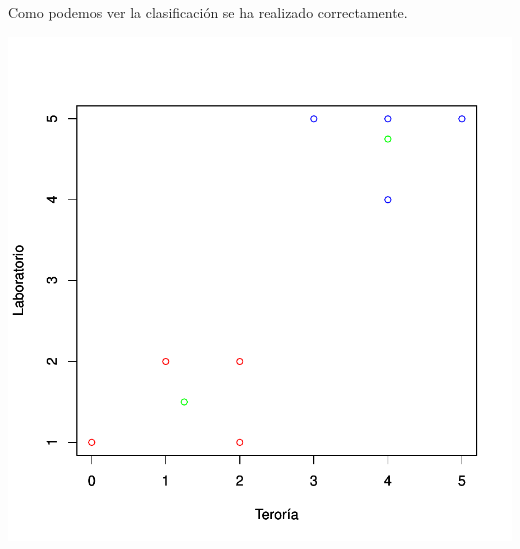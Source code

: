 \documentclass [a4paper] {article}
\begin{document}
Como podemos ver la clasificación se ha realizado correctamente.
\begin{center}
\includegraphics{entrega-representacion_del_resultado}
\end{center}
\end{document}
